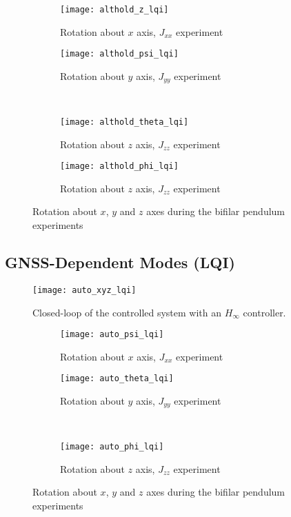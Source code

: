 \begin{figure}[H]
\begin{subfigure}{.5\linewidth}
\centering
\texttt{[image: althold\_z\_lqi]}
\caption{Rotation about $x$ axis, $J_{xx}$ experiment}
\label{fig:althold_z_lqi1}
\end{subfigure}%
\begin{subfigure}{.5\linewidth}
\centering
\texttt{[image: althold\_psi\_lqi]}
\caption{Rotation about $y$ axis, $J_{yy}$ experiment}
\label{fig:althold_psi_lqi1}
\end{subfigure}\\[1ex]
\begin{subfigure}{0.5\linewidth}
\centering
\texttt{[image: althold\_theta\_lqi]}
\caption{Rotation about $z$ axis, $J_{zz}$ experiment}
\label{fig:althold_theta_lqi1}
\end{subfigure}
\begin{subfigure}{0.5\linewidth}
\centering
\texttt{[image: althold\_phi\_lqi]}
\caption{Rotation about $z$ axis, $J_{zz}$ experiment}
\label{fig:althold_phi_lqi1}
\end{subfigure}
\caption{Rotation about $x$, $y$ and $z$ axes during the bifilar pendulum experiments}
\label{fig:althold_lqi1}
\end{figure}


\subsection{GNSS-Dependent Modes (LQI)}

\begin{figure}[h]
	\begin{center}
	\texttt{[image: auto\_xyz\_lqi]}
	\caption{Closed-loop of the controlled system with an $H_{\infty}$ controller.}
	\label{fig:auto_xyz_lqi1}
	\end{center}
	\end{figure}
	
\begin{figure}[H]
\begin{subfigure}{.5\linewidth}
\centering
\texttt{[image: auto\_psi\_lqi]}
\caption{Rotation about $x$ axis, $J_{xx}$ experiment}
\label{fig:auto_psi_lqi1}
\end{subfigure}%
\begin{subfigure}{.5\linewidth}
\centering
\texttt{[image: auto\_theta\_lqi]}
\caption{Rotation about $y$ axis, $J_{yy}$ experiment}
\label{fig:auto_theta_lqi1}
\end{subfigure}\\[1ex]
\begin{subfigure}{\linewidth}
\centering
\texttt{[image: auto\_phi\_lqi]}
\caption{Rotation about $z$ axis, $J_{zz}$ experiment}
\label{fig:auto_psi_lqi1}
\end{subfigure}
\caption{Rotation about $x$, $y$ and $z$ axes during the bifilar pendulum experiments}
\label{fig:auto_lqi1}
\end{figure}

